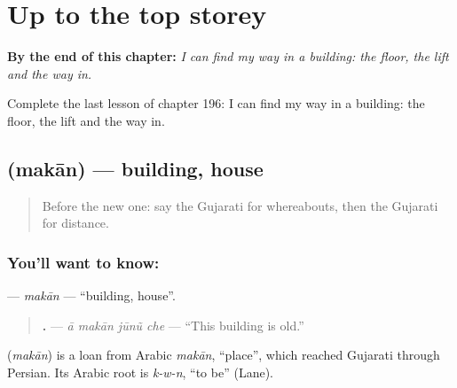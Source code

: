 
\chapter{Up to the top storey}
\label{ch:gu-up-to-the-top-storey}

\begin{chapteropening}
\textbf{By the end of this chapter:} \emph{I can find my way in a building: the floor, the lift and the way in.}

Complete the last lesson of chapter 196: I can find my way in a building: the floor, the lift and the way in.
\end{chapteropening}

\section[\texorpdfstring{\gu{મકાન} (makān)}{મકાન (makān)}]{ (makān) — building, house}

\label{lesson:GU-C196-makan}



\begin{quote}
Before the new one: say the Gujarati for whereabouts, then the Gujarati for distance.
\end{quote}

\subsection*{You'll want to know: }
\textbf{} — \emph{makān} — \textquotedblleft{}building, house\textquotedblright{}.

\begin{quote}
\textbf{   .} — \emph{ā makān jūnũ che} — \textquotedblleft{}This building is old.\textquotedblright{}
\end{quote}

\begin{cousinweb}
\textbf{} (\emph{makān}) is a loan from Arabic \emph{makān}, \textquotedblleft{}place\textquotedblright{}, which reached Gujarati through Persian. Its Arabic root is \emph{k-w-n}, \textquotedblleft{}to be\textquotedblright{} (Lane).
\end{cousinweb}

